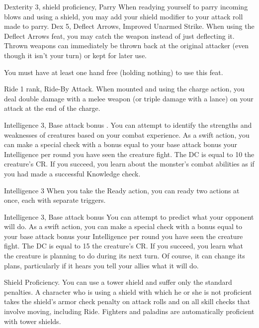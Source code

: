 \featpres Dexterity 3, shield proficiency, Parry
\featben When readying yourself to parry incoming blows and using a shield, you may add your shield modifier to your attack roll made to parry.
 Dex 5, Deflect Arrows, Improved Unarmed Strike.
 When using the Deflect Arrows feat, you may catch the weapon instead of just deflecting it. Thrown weapons can immediately be thrown back at the original attacker (even though it isn't your turn) or kept for later use.
\par You must have at least one hand free (holding nothing) to use this feat.%

 Ride 1 rank, Ride-By Attack.
 When mounted and using the charge action, you deal double damage with a melee weapon (or triple damage with a lance) on your attack at the end of the charge.%

 Intelligence 3, Base attack bonus .
 You can attempt to identify the strengths and weaknesses of creatures based on your combat experience. As a swift action, you can make a special check with a bonus equal to your base attack bonus \add your Intelligence  per round you have seen the creature fight. The DC is equal to 10 \add the creature's CR. If you succeed, you learn about the monster's combat abilities as if you had made a successful Knowledge check.

 Intelligence 3
 When you take the Ready action, you can ready two actions at once, each with separate triggers.

 Intelligence 3, Base attack bonus 
 You can attempt to predict what your opponent will do. As a swift action, you can make a special check with a bonus equal to your base attack bonus \add your Intelligence  per round you have seen the creature fight. The DC is equal to 15 \add the creature's CR. If you succeed, you learn what the creature is planning to do during its next turn. Of course, it can change its plans, particularly if it hears you tell your allies what it will do.

 Shield Proficiency.
 You can use a tower shield and suffer only the standard penalties.
 A character who is using a shield with which he or she is not proficient takes the shield's armor check penalty on attack rolls and on all skill checks that involve moving, including Ride.
 Fighters and paladins are automatically proficient with tower shields.

